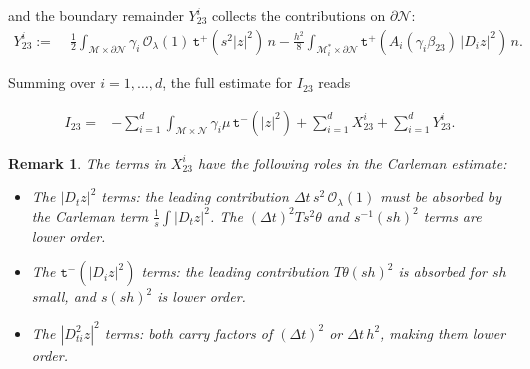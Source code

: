 \documentclass[11pt,oneside,leqno]{amsart}
\numberwithin{equation}{section}
\numberwithin{equation}{section}
\newtheorem{remark}[theorem]{Remark}
\newcommand{\trp}{\mathtt t^+}
\newcommand{\trm}{\mathtt t^-}
\begin{document}
and the boundary remainder $Y_{23}^{i}$ collects the contributions on $\partial\mathcal{N}$:
\begin{equation}\label{eq:B23}
\begin{aligned}
Y_{23}^{i}:=&\;\frac{1}{2}\int_{\mathcal{M}\times\partial\mathcal{N}}\gamma_{i}\,\mathcal{O}_{\lambda}(1)\,\trp(s^{2}|z|^{2})\,n-\frac{h^{2}}{8}\int_{\mathcal{M}_{i}^{\ast}\times\partial\mathcal{N}}\trp(A_{i}(\gamma_{i}\beta_{23})\,|D_{i}z|^{2})\,n.
\end{aligned}
\end{equation}
\par Summing over $i=1,\ldots,d$, the full estimate for $I_{23}$ reads

\begin{equation}\label{eq:I23:total}
\begin{aligned}
I_{23}=&-\sum_{i=1}^{d}\int_{\mathcal{M}\times\mathcal{N}}\gamma_{i}\mu\,\trm(|z|^{2})+\sum_{i=1}^{d}X_{23}^{i}+\sum_{i=1}^{d}Y_{23}^{i}.
\end{aligned}
\end{equation}
\begin{remark}
The terms in $X_{23}^{i}$ have the following roles in the Carleman estimate:
\begin{itemize}
    \item The $|D_{t}z|^{2}$ terms: the leading contribution $\Delta t\,s^{2}\,\mathcal{O}_{\lambda}(1)$ must be absorbed by the Carleman term $\frac{1}{s}\int|D_{t}z|^{2}$. The $(\Delta t)^{2}Ts^{2}\theta$ and $s^{-1}(sh)^{2}$ terms are lower order.
    \item The $\trm(|D_{i}z|^{2})$ terms: the leading contribution $T\theta(sh)^{2}$ is absorbed for $sh$ small, and $s(sh)^{2}$ is lower order.
    \item The $|D_{ti}^{2}z|^{2}$ terms: both carry factors of $(\Delta t)^{2}$ or $\Delta t\,h^{2}$, making them lower order.
\end{itemize}
\end{remark}

\end{document}
